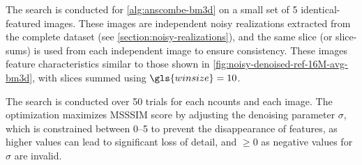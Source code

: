 The search is conducted for \cref{alg:anscombe-bm3d} on a small set of \num{5} identical-featured images. These images are independent noisy realizations extracted from the complete dataset (see \cref{section:noisy-realizations}), and the same slice (or slice-sums) is used from each independent image to ensure consistency. These images feature characteristics similar to those shown in \cref{fig:noisy-denoised-ref-16M-avg-bm3d}, with slices summed using $\gls{winsize} = \num{10}$.

The search is conducted over \num{50} trials for each \gls{ncounts} and each image. The optimization maximizes \gls{MSSSIM} score by adjusting the denoising parameter $\sigma$, which is constrained between \numrange{0}{5} to prevent the disappearance of features, as higher values can lead to significant loss of detail, and $\geq 0$ as negative values for $\sigma$ are invalid.


